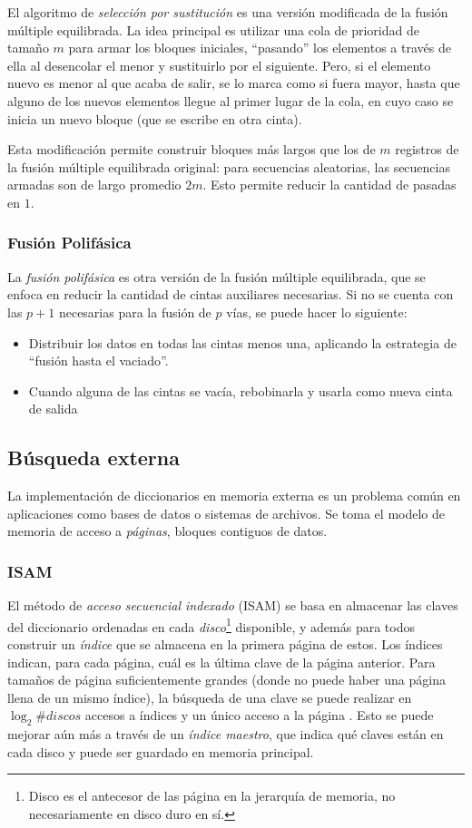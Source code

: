 \documentclass{article}
\begin{document}
El algoritmo de \textit{selección por sustitución} es una versión modificada de la fusión múltiple equilibrada. La idea principal es utilizar una cola de prioridad de tamaño $m$ para armar los bloques iniciales, ``pasando'' los elementos a través de ella al desencolar el menor y sustituirlo por el siguiente. Pero, si el elemento nuevo es menor al que acaba de salir, se lo marca como si fuera mayor, hasta que alguno de los nuevos elementos llegue al primer lugar de la cola, en cuyo caso se inicia un nuevo bloque (que se escribe en otra cinta).

Esta modificación permite construir bloques más largos que los de $m$ registros de la fusión múltiple equilibrada original: para secuencias aleatorias, las secuencias armadas son de largo promedio $2m$. Esto permite reducir la cantidad de pasadas en $1$.

\subsubsection{Fusión Polifásica}

La \textit{fusión polifásica} es otra versión de la fusión múltiple equilibrada, que se enfoca en reducir la cantidad de cintas auxiliares necesarias. Si no se cuenta con las $p + 1$ necesarias para la fusión de $p$ vías, se puede hacer lo siguiente:
\begin{itemize}
    \item Distribuir los datos en todas las cintas menos una, aplicando la estrategia de ``fusión hasta el vaciado''.
    \item Cuando alguna de las cintas se vacía, rebobinarla y usarla como nueva cinta de salida
\end{itemize}

\subsection{Búsqueda externa}

La implementación de diccionarios en memoria externa es un problema común en aplicaciones como bases de datos o sistemas de archivos. Se toma el modelo de memoria de acceso a \textit{páginas}, bloques contiguos de datos.

\subsubsection{ISAM}

El método de \textit{acceso secuencial indexado} (ISAM) se basa en almacenar las claves del diccionario ordenadas en cada \textit{disco}\footnote{Disco es el antecesor de las página en la jerarquía de memoria, no necesariamente en disco duro en sí.} disponible, y además para todos construir un \textit{índice} que se almacena en la primera página de estos. Los índices indican, para cada página, cuál es la última clave de la página anterior. Para tamaños de página suficientemente grandes (donde no puede haber una página llena de un mismo índice), la búsqueda de una clave se puede realizar en $\log_2{\#discos}$ accesos a índices y un único acceso a la página . Esto se puede mejorar aún más a través de un \textit{índice maestro}, que indica qué claves están en cada disco y puede ser guardado en memoria principal.
\end{document}
